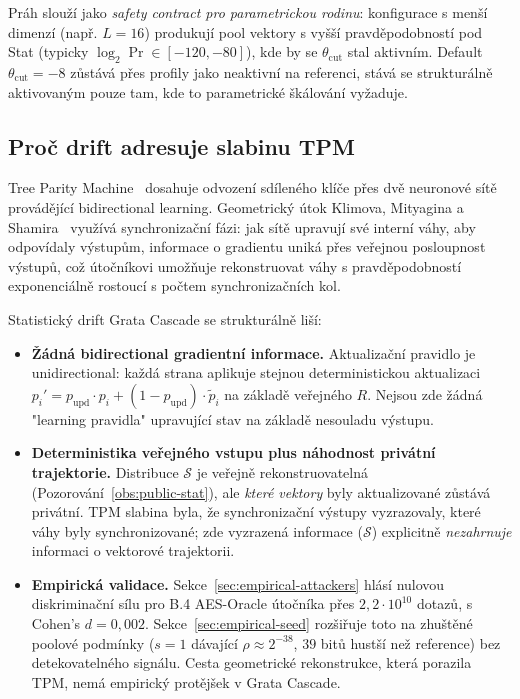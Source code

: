 \documentclass[11pt,a4paper]{article}
\begin{document}
Práh slouží jako \emph{safety contract pro parametrickou rodinu}: konfigurace s menší dimenzí (např. $L = 16$) produkují pool vektory s vyšší pravděpodobností pod Stat (typicky $\log_2 \Pr \in [-120, -80]$), kde by se $\theta_\text{cut}$ stal aktivním. Default $\theta_\text{cut} = -8$ zůstává přes profily jako neaktivní na referenci, stává se strukturálně aktivovaným pouze tam, kde to parametrické škálování vyžaduje.

\subsection{Proč drift adresuje slabinu TPM}\label{sec:tpm-weakness}

Tree Parity Machine~\cite{KKK2002} dosahuje odvození sdíleného klíče přes dvě neuronové sítě provádějící bidirectional learning. Geometrický útok Klimova, Mityagina a Shamira~\cite{KMS2003} využívá synchronizační fázi: jak sítě upravují své interní váhy, aby odpovídaly výstupům, informace o gradientu uniká přes veřejnou posloupnost výstupů, což útočníkovi umožňuje rekonstruovat váhy s pravděpodobností exponenciálně rostoucí s počtem synchronizačních kol.

Statistický drift Grata Cascade se strukturálně liší:

\begin{itemize}[leftmargin=*]
\item \textbf{Žádná bidirectional gradientní informace.} Aktualizační pravidlo je unidirectional: každá strana aplikuje stejnou deterministickou aktualizaci $p_i' = p_\text{upd} \cdot p_i + (1-p_\text{upd}) \cdot \tilde{p}_i$ na základě veřejného $R$. Nejsou zde žádná "learning pravidla" upravující stav na základě nesouladu výstupu.
\item \textbf{Deterministika veřejného vstupu plus náhodnost privátní trajektorie.} Distribuce $\mathcal{S}$ je veřejně rekonstruovatelná (Pozorování~\ref{obs:public-stat}), ale \emph{které vektory} byly aktualizované zůstává privátní. TPM slabina byla, že synchronizační výstupy vyzrazovaly, které váhy byly synchronizované; zde vyzrazená informace ($\mathcal{S}$) explicitně \emph{nezahrnuje} informaci o vektorové trajektorii.
\item \textbf{Empirická validace.} Sekce~\ref{sec:empirical-attackers} hlásí nulovou diskriminační sílu pro B.4 AES-Oracle útočníka přes $2{,}2 \cdot 10^{10}$ dotazů, s Cohen's $d = 0{,}002$. Sekce~\ref{sec:empirical-seed} rozšiřuje toto na zhuštěné poolové podmínky ($s = 1$ dávající $\rho \approx 2^{-38}$, $39$ bitů hustší než reference) bez detekovatelného signálu. Cesta geometrické rekonstrukce, která porazila TPM, nemá empirický protějšek v Grata Cascade.
\end{itemize}
\end{document}
